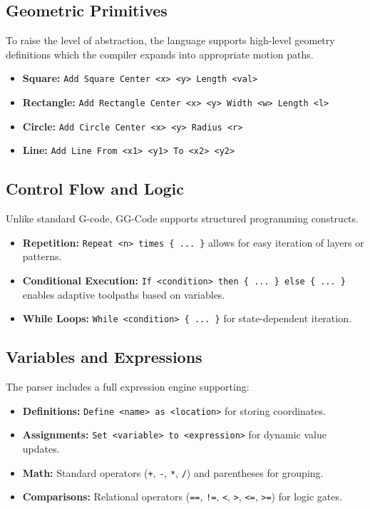\subsection{Geometric Primitives}
To raise the level of abstraction, the language supports high-level geometry definitions which the compiler expands into appropriate motion paths.
\begin{itemize}
    \item \textbf{Square:} \texttt{Add Square Center \textless x\textgreater\ \textless y\textgreater\ Length \textless val\textgreater}
    \item \textbf{Rectangle:} \texttt{Add Rectangle Center \textless x\textgreater\ \textless y\textgreater\ Width \textless w\textgreater\ Length \textless l\textgreater}
    \item \textbf{Circle:} \texttt{Add Circle Center \textless x\textgreater\ \textless y\textgreater\ Radius \textless r\textgreater}
    \item \textbf{Line:} \texttt{Add Line From \textless x1\textgreater\ \textless y1\textgreater\ To \textless x2\textgreater\ \textless y2\textgreater}
\end{itemize}

\subsection{Control Flow and Logic}
Unlike standard G-code, GG-Code supports structured programming constructs.
\begin{itemize}
    \item \textbf{Repetition:} \texttt{Repeat \textless n\textgreater\ times \{ ... \}} allows for easy iteration of layers or patterns.
    \item \textbf{Conditional Execution:} \texttt{If \textless condition\textgreater\ then \{ ... \} else \{ ... \}} enables adaptive toolpaths based on variables.
    \item \textbf{While Loops:} \texttt{While \textless condition\textgreater\ \{ ... \}} for state-dependent iteration.
\end{itemize}

\subsection{Variables and Expressions}
The parser includes a full expression engine supporting:
\begin{itemize}
    \item \textbf{Definitions:} \texttt{Define \textless name\textgreater\ as \textless location\textgreater} for storing coordinates.
    \item \textbf{Assignments:} \texttt{Set \textless variable\textgreater\ to \textless expression\textgreater} for dynamic value updates.
    \item \textbf{Math:} Standard operators (\texttt{+}, \texttt{-}, \texttt{*}, \texttt{/}) and parentheses for grouping.
    \item \textbf{Comparisons:} Relational operators (\texttt{==}, \texttt{!=}, \texttt{\textless}, \texttt{\textgreater}, \texttt{\textless=}, \texttt{\textgreater=}) for logic gates.
\end{itemize}


